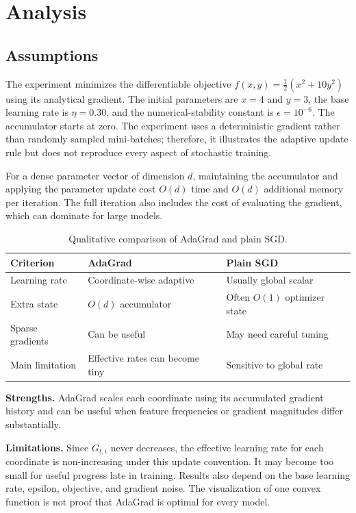 \documentclass[11pt,a4paper]{article}
\begin{document}
\section{Analysis}

\subsection{Assumptions}
The experiment minimizes the differentiable objective
$f(x,y)=\frac{1}{2}(x^2+10y^2)$ using its analytical gradient.
The initial parameters are $x=4$ and $y=3$, the base learning rate
is $\eta=0.30$, and the numerical-stability constant is
$\epsilon=10^{-6}$. The accumulator starts at zero. The experiment
uses a deterministic gradient rather than randomly sampled
mini-batches; therefore, it illustrates the adaptive update rule
but does not reproduce every aspect of stochastic training.

For a dense parameter vector of dimension $d$, maintaining the accumulator
and applying the parameter update cost $O(d)$ time and $O(d)$ additional memory
per iteration. The full iteration also includes the cost of evaluating the
gradient, which can dominate for large models.

\begin{table}[h]
\centering
\begin{tabular}{@{}lll@{}}
\toprule
\textbf{Criterion} & \textbf{AdaGrad} & \textbf{Plain SGD}\\
\midrule
Learning rate & Coordinate-wise adaptive & Usually global scalar\\
Extra state & $O(d)$ accumulator & Often $O(1)$ optimizer state\\
Sparse gradients & Can be useful & May need careful tuning\\
Main limitation & Effective rates can become tiny & Sensitive to global rate\\
\bottomrule
\end{tabular}
\caption{Qualitative comparison of AdaGrad and plain SGD.}
\label{tab:comparison}
\end{table}

\textbf{Strengths.} AdaGrad scales each coordinate using its accumulated
gradient history and can be useful when feature frequencies or gradient
magnitudes differ substantially.

\textbf{Limitations.} Since $G_{t,i}$ never decreases, the effective learning
rate for each coordinate is non-increasing under this update convention. It may
become too small for useful progress late in training. Results also depend on
the base learning rate, epsilon, objective, and gradient noise. The visualization
of one convex function is not proof that AdaGrad is optimal for every model.
\end{document}
